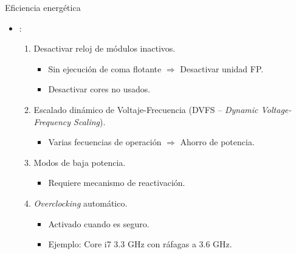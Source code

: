 \begin{frame}[t]{Eficiencia energética}
\begin{itemize}
 \item {}:
   \begin{enumerate}
     \item Desactivar reloj de módulos inactivos.
       \begin{itemize}
         \item Sin ejecución de coma flotante $\Rightarrow$ Desactivar unidad FP.
         \item Desactivar cores no usados.
       \end{itemize}

     \item Escalado dinámico de Voltaje-Frecuencia (DVFS -- \emph{Dynamic Voltage-Frequency Scaling}).
       \begin{itemize}
         \item Varias fecuencias de operación $\Rightarrow$ Ahorro de potencia.
       \end{itemize}

     \item Modos de baja potencia.
       \begin{itemize}
         \item Requiere mecanismo de reactivación.
       \end{itemize}

     \item \emph{Overclocking} automático.
       \begin{itemize}
         \item Activado cuando es seguro.
         \item Ejemplo: Core i7 3.3 GHz con ráfagas a 3.6 GHz.
       \end{itemize}
    \end{enumerate}
\end{itemize}
\end{frame}

